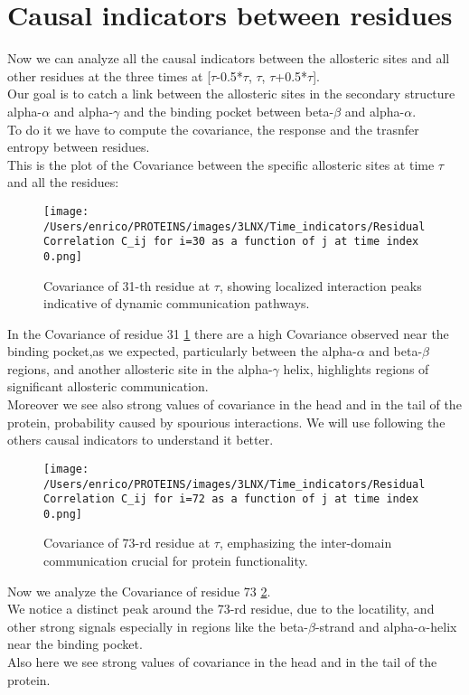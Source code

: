 \documentclass[English, Lau, oneside]{sapthesis}
\begin{document}
\newpage
\newpage
\section{Causal indicators between residues}
Now we can analyze all the causal indicators between the allosteric sites and all other residues at the three times at [\(\tau\)-0.5*\(\tau\), \(\tau\), \(\tau\)+0.5*\(\tau\)].\\
Our goal is to catch a link between the allosteric sites in the secondary structure alpha-$\alpha$ and alpha-$\gamma$ and the binding pocket between beta-$\beta$ and alpha-$\alpha$.\\
To do it we have to compute the covariance, the response and the trasnfer entropy between residues.\\

This is the plot of the Covariance between the specific allosteric sites at time \(\tau\) and all the residues:
\begin{figure}[h!]
    \centering
    \texttt{[image: /Users/enrico/PROTEINS/images/3LNX/Time\_indicators/Residual Correlation C\_ij for i=30 as a function of j at time index 0.png]}
    \caption{Covariance of 31-th residue at \(\tau\), showing localized interaction peaks indicative of dynamic communication pathways.}
    \label{fig:Covariance of 31-th residue}
\end{figure}
\newpage
In the Covariance of residue 31 \ref{fig:Covariance of 31-th residue} there are a high Covariance observed near the binding pocket,as we expected, particularly between the alpha-$\alpha$ and beta-$\beta$ regions, and another allosteric site in the alpha-$\gamma$ helix, highlights regions of significant allosteric communication.\\
Moreover we see also strong values of covariance in the head and in the tail of the protein, probability caused by spourious interactions. 
We will use following the others causal indicators to understand it better.\\

\begin{figure}[h!]
    \centering
    \texttt{[image: /Users/enrico/PROTEINS/images/3LNX/Time\_indicators/Residual Correlation C\_ij for i=72 as a function of j at time index 0.png]}
    \caption{Covariance of 73-rd residue at \(\tau\), emphasizing the inter-domain communication crucial for protein functionality.}
    \label{fig:Covariance of 73-rd residue}
\end{figure}
Now we analyze the Covariance of residue 73 \ref{fig:Covariance of 73-rd residue}.\\
We notice a distinct peak around the 73-rd residue, due to the locatility, and other strong signals especially in regions like the beta-$\beta$-strand and alpha-$\alpha$-helix near the binding pocket.\\
Also here we see strong values of covariance in the head and in the tail of the protein.\\
\end{document}
